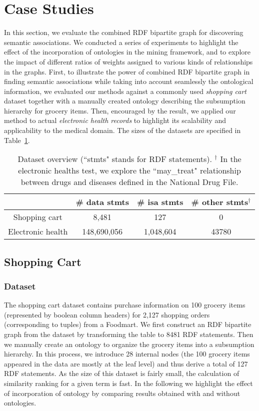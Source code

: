 \section{Case Studies}
In this section, we evaluate the combined RDF bipartite graph for discovering semantic associations. We conducted a series of experiments to highlight the effect of the incorporation of ontologies in the mining framework, and to explore the impact of different ratios of weights assigned to various kinds of relationships in the graphs. First, to illustrate the power of combined RDF bipartite graph in finding semantic associations while taking into account seamlessly the ontological information, we evaluated our methods against a commonly used \emph{shopping cart} dataset together with a manually created ontology describing the subsumption hierarchy for grocery items.  Then, encouraged by the result, we applied our method to actual \emph{electronic health records} to highlight its scalability and applicability to the medical domain. The sizes of the datasets are specified in Table~\ref{tbl:exp_overview}.

\begin{table}[tbh]\scriptsize
\begin{center}
\begin{tabular}{c|c|c|c}
\hline
    & \# data stmts & \# isa stmts & \# other stmts$^\dag$ \\
    \hline
  Shopping cart     &  8,481       & 127       &    0\\
  Electronic health &  148,690,056  & 1,048,604 &    43780\\
  \hline
\end{tabular}
\end{center}
\caption[Overview of the test cases.]{\label{tbl:exp_overview} Dataset overview (``stmts" stands for RDF statements). $^\dag$ In the electronic healths test, we explore the ``may\_treat" relationship between drugs and diseases defined in the National Drug File.}
\end{table}


\subsection{Shopping Cart}
\subsubsection{Dataset}
The shopping cart dataset contains purchase information on 100 grocery items (represented by boolean column headers) for 2,127 shopping orders (corresponding to tuples) from a Foodmart. We first construct an RDF bipartite graph from the dataset by transforming the table to 8481 RDF statements. Then we manually create an ontology to organize the grocery items into a subsumption hierarchy. In this process, we introduce 28 internal nodes (the 100 grocery items appeared in the data are mostly at the leaf level) and thus derive a total of 127 RDF statements. As the size of this dataset is fairly small, the calculation of similarity ranking for a given term is fast. In the following we highlight the effect of incorporation of ontology by comparing results obtained with and without ontologies.


